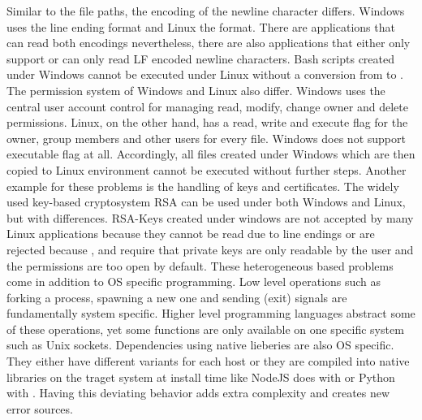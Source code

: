         Similar to the file paths, the encoding of the newline character differs. Windows uses the  line ending format and Linux the  format. There are applications that can read both encodings nevertheless, there are also applications that either only support  or can only read LF encoded newline characters. Bash scripts created under Windows cannot be executed under Linux without a conversion from  to . The permission system of Windows and Linux also differ. Windows uses the central user account control for managing read, modify, change owner and delete permissions. Linux, on the other hand, has a read, write and execute flag for the owner, group members and other users for every file. Windows does not support executable flag at all. Accordingly, all files created under Windows which are then copied to Linux environment cannot be executed without further steps. Another example for these problems is the handling of keys and certificates. The widely used key-based cryptosystem \ac{RSA} can be used under both Windows and Linux, but with differences. \ac{RSA}-Keys created under windows are not accepted by many Linux applications because they cannot be read due to  line endings or are rejected because ,  and  require that private keys are only readable by the user and the permissions are too open by default.\newline
        These heterogeneous based problems come in addition to \acl{OS} specific programming. Low level operations such as forking a process, spawning a new one and sending (exit) signals are fundamentally system specific. Higher level programming languages abstract some of these operations, yet some functions are only available on one specific system such as Unix sockets. Dependencies using native lieberies are also \ac{OS} specific. They either have different variants for each host or they are compiled into native libraries on the traget system at install time like NodeJS does with  or Python with . Having this deviating behavior adds extra complexity and creates new error sources.

